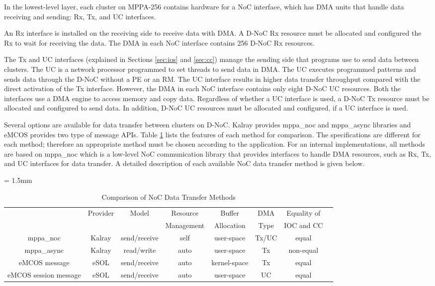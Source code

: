 In the lowest-level layer, each cluster on MPPA-256 contains hardware for a NoC interface, which has DMA units that handle data receiving and sending: Rx, Tx, and UC interfaces.

An Rx interface is installed on the receiving side to receive data with DMA.
A D-NoC Rx resource must be allocated and configured the Rx to wait for receiving the data.
The DMA in each NoC interface contains 256 D-NoC Rx resources.

The Tx and UC interfaces (explained in Sections \ref{sec:ios} and \ref{sec:cc}) manage the sending side that programs use to send data between clusters.
The UC is a network processor programmed to set threads to send data in DMA.
The UC executes programmed patterns and sends data through the D-NoC without a PE or an RM.
The UC interface results in higher data transfer throughput compared with the direct activation of the Tx interface.
However, the DMA in each NoC interface contains only eight D-NoC UC resources.
Both the interfaces use a DMA engine to access memory and copy data.
Regardless of whether a UC interface is used, a D-NoC Tx resource must be allocated and configured to send data.
In addition, D-NoC UC resources must be allocated and configured, if a UC interface is used.

Several options are available for data transfer between clusters on D-NoC.
Kalray provides mppa\_noc and mppa\_async libraries and eMCOS provides two type of message APIs.
Table \ref{tb:comparison_noc} lists the features of each method for comparison.
The specifications are different for each method; therefore an appropriate method must be chosen according to the application.
For an internal implementations, all methods are based on mppa\_noc which is a low-level NoC communication library that provides interfaces to handle DMA resources, such as Rx, Tx, and UC interfaces for data transfer.
A detailed description of each available NoC data transfer method is given below.

\begin{table}[thbp]
  \caption{\label{tb:comparison_noc}
    Comparison of NoC Data Transfer Methods}
  \centering
  \scriptsize	                    %
  \tabcolsep = 1.5mm              %
  \begin{tabular}{c|ccccccc}
    \hline
    & \multirow{2}{*}{Provider} & \multirow{2}{*}{Model} & Resource & Buffer & DMA & Equality of \\
    & & & Management & Allocation & Type & IOC and CC \\
    \hline
    \hline
    mppa\_noc & Kalray & send/receive & self & user-space & Tx/UC & equal \\
    mppa\_async & Kalray & read/write & auto & user-space & Tx & non-equal\\
    eMCOS message & eSOL & send/receive & auto & kernel-space & Tx & equal \\
    eMCOS session message & eSOL & send/receive & auto & user-space & UC & equal \\
    \hline
  \end{tabular}
\end{table}

